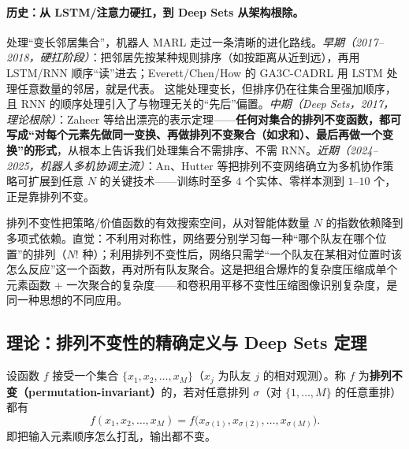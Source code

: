 \paragraph{历史：从 LSTM/注意力硬扛，到 Deep Sets 从架构根除。}
处理“变长邻居集合”，机器人 MARL 走过一条清晰的进化路线。\emph{早期（2017--2018，硬扛阶段）}：把邻居先按某种规则排序（如按距离从近到远），再用 LSTM/RNN 顺序“读”进去；Everett/Chen/How 的 GA3C-CADRL 用 LSTM 处理任意数量的邻居，就是代表\cite{everett2018cadrl}。%
这能处理变长，但排序仍在往集合里强加顺序，且 RNN 的顺序处理引入了与物理无关的“先后”偏置。\emph{中期（Deep Sets，2017，理论根除）}：Zaheer 等给出漂亮的表示定理\cite{zaheer2017deepsets}——\textbf{任何对集合的排列不变函数，都可写成“对每个元素先做同一变换、再做排列不变聚合（如求和）、最后再做一个变换”的形式}，从根本上告诉我们处理集合不需排序、不需 RNN。\emph{近期（2024--2025，机器人多机协调主流）}：An、Hutter 等把排列不变网络确立为多机协作策略可扩展到任意 $N$ 的关键技术\cite{an2024perminv}——训练时至多 $4$ 个实体、零样本测到 $1$--$10$ 个，正是靠排列不变。

\begin{insight}[排列不变把搜索空间从指数压到多项式]
排列不变性把策略/价值函数的有效搜索空间，从对智能体数量 $N$ 的指数依赖降到多项式依赖。直觉：不利用对称性，网络要分别学习每一种“哪个队友在哪个位置”的排列（$N!$ 种）；利用排列不变性后，网络只需学“一个队友在某相对位置时该怎么反应”这一个函数，再对所有队友聚合。这是把组合爆炸的复杂度压缩成单个元素函数 $+$ 一次聚合的复杂度——和卷积用平移不变性压缩图像识别复杂度，是同一种思想的不同应用。
\end{insight}

\subsection{理论：排列不变性的精确定义与 Deep Sets 定理}
\label{sec:mc-deepsets}

\begin{definition}[排列不变函数]\label{def:mc-perm-inv}
设函数 $f$ 接受一个集合 $\{x_1,x_2,\dots,x_M\}$（$x_j$ 为队友 $j$ 的相对观测）。称 $f$ 为\textbf{排列不变（permutation-invariant）}的，若对任意排列 $\sigma$（对 $\{1,\dots,M\}$ 的任意重排）都有
\begin{equation}
  f(x_1,x_2,\dots,x_M)=f\big(x_{\sigma(1)},x_{\sigma(2)},\dots,x_{\sigma(M)}\big).
  \label{eq:mc-perm-inv}
\end{equation}
即把输入元素顺序怎么打乱，输出都不变。
\end{definition}

